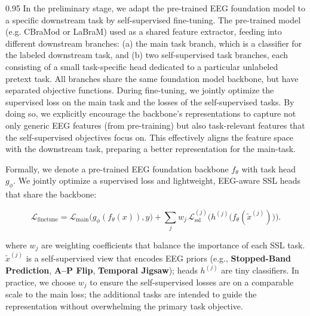 \documentclass{article} %
\begin{document}
\begin{spacing}{0.95}
In the preliminary stage, we adapt the pre-trained EEG foundation model to a specific downstream task by self-supervised fine-tuning. The pre-trained model (e.g. CBraMod or LaBraM) used as a shared feature extractor, feeding into different downstream branches: (a) the main task branch, which is a classifier for the labeled downstream task, and (b) two self-supervised task branches, each consisting of a small task-specific head dedicated to a particular unlabeled pretext task. All branches share the same foundation model backbone, but have separated objective functions. During fine-tuning, we jointly optimize the supervised loss on the main task and the losses of the self-supervised tasks. By doing so, we explicitly encourage the backbone’s representations to capture not only generic EEG features (from pre-training) but also task-relevant features that the self-supervised objectives focus on. This effectively aligns the feature space with the downstream task, preparing a better representation for the main-task.

Formally, we denote a pre-trained EEG foundation backbone $f_\theta$ with task head $g_\phi$. We jointly optimize a supervised loss and lightweight, EEG-aware SSL heads that share the backbone:

\begin{equation}
\mathcal{L}_{\text{finetune}} = \mathcal{L}_{\text{main}}\big(g_\phi(f_\theta(x)), y\big) 
+ \sum_j w_j \, \mathcal{L}_{\text{ssl}}^{(j)} \Big(h^{(j)}\big(f_\theta(\tilde{x}^{(j)})\big)\Big).
\end{equation}




where $w_j$ are weighting coefficients that balance the importance of each SSL task. $\tilde{x}^{(j)}$ is a self-supervised view that encodes EEG priors (e.g., \textbf{Stopped-Band Prediction}, \textbf{A--P Flip}, \textbf{Temporal Jigsaw}); heads $h^{(j)}$ are tiny classifiers.  In practice, we choose $w_j$ to ensure the self-supervised losses are on a comparable scale to the main loss; the additional tasks are intended to guide the representation without overwhelming the primary task objective.


\end{spacing}
\end{document}
